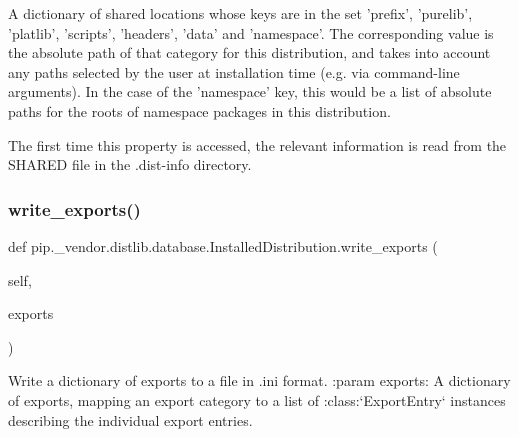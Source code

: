 \begin{DoxyVerb}A dictionary of shared locations whose keys are in the set 'prefix',
'purelib', 'platlib', 'scripts', 'headers', 'data' and 'namespace'.
The corresponding value is the absolute path of that category for
this distribution, and takes into account any paths selected by the
user at installation time (e.g. via command-line arguments). In the
case of the 'namespace' key, this would be a list of absolute paths
for the roots of namespace packages in this distribution.

The first time this property is accessed, the relevant information is
read from the SHARED file in the .dist-info directory.
\end{DoxyVerb}
 \mbox{\label{classpip_1_1__vendor_1_1distlib_1_1database_1_1InstalledDistribution_a8089a042171558c55789b80c442fae39}} 
\subsubsection{\texorpdfstring{write\+\_\+exports()}{write\_exports()}}
{\footnotesize\ttfamily def pip.\+\_\+vendor.\+distlib.\+database.\+Installed\+Distribution.\+write\+\_\+exports (\begin{DoxyParamCaption}\item[{}]{self,  }\item[{}]{exports }\end{DoxyParamCaption})}

\begin{DoxyVerb}Write a dictionary of exports to a file in .ini format.
:param exports: A dictionary of exports, mapping an export category to
        a list of :class:`ExportEntry` instances describing the
        individual export entries.
\end{DoxyVerb}
 \mbox{\label{classpip_1_1__vendor_1_1distlib_1_1database_1_1InstalledDistribution_a3b799b28c162cab4fd480fda0f2a852e}} 
